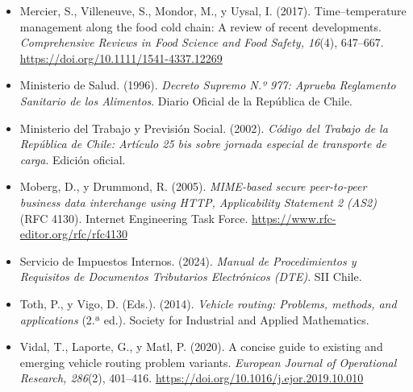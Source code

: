 \documentclass[carta,firma]{lafrox}
\begin{document}
\begin{itemize}[itemsep=1pt]
\begin{samepage}
\end{samepage}
\item \begin{samepage}
Mercier, S., Villeneuve, S., Mondor, M., y Uysal, I. (2017). Time–temperature management along the food cold chain: A review of recent developments. \emph{Comprehensive Reviews in Food Science and Food Safety, 16}(4), 647–667. \url{https://doi.org/10.1111/1541-4337.12269}
\end{samepage}
\item \begin{samepage}
Ministerio de Salud. (1996). \emph{Decreto Supremo N.º 977: Aprueba Reglamento Sanitario de los Alimentos}. Diario Oficial de la República de Chile.
\end{samepage}
\item \begin{samepage}
Ministerio del Trabajo y Previsión Social. (2002). \emph{Código del Trabajo de la República de Chile: Artículo 25 bis sobre jornada especial de transporte de carga}. Edición oficial.
\end{samepage}
\item \begin{samepage}
Moberg, D., y Drummond, R. (2005). \emph{MIME-based secure peer-to-peer business data interchange using HTTP, Applicability Statement 2 (AS2)} (RFC 4130). Internet Engineering Task Force. \url{https://www.rfc-editor.org/rfc/rfc4130}
\end{samepage}
\item \begin{samepage}
Servicio de Impuestos Internos. (2024). \emph{Manual de Procedimientos y Requisitos de Documentos Tributarios Electrónicos (DTE)}. SII Chile.
\end{samepage}
\item \begin{samepage}
Toth, P., y Vigo, D. (Eds.). (2014). \emph{Vehicle routing: Problems, methods, and applications} (2.ª ed.). Society for Industrial and Applied Mathematics.
\end{samepage}
\item \begin{samepage}
Vidal, T., Laporte, G., y Matl, P. (2020). A concise guide to existing and emerging vehicle routing problem variants. \emph{European Journal of Operational Research, 286}(2), 401–416. \url{https://doi.org/10.1016/j.ejor.2019.10.010}
\end{samepage}
\end{itemize}
\end{document}
